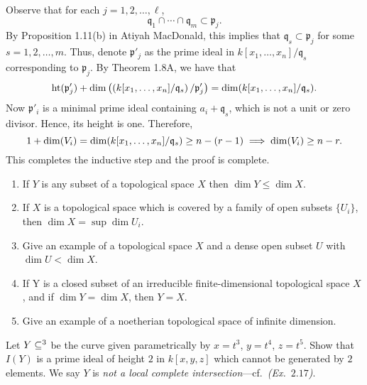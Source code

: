 \documentclass{/Users/SHER/Documents/Hartshorne-Exercises/hw_pset} %
\DeclareMathOperator{\Ht}{\rm{ht}}    %
\DeclareMathOperator{\Dim}{\rm{dim}}  %
\let\aa\relax
\DeclareMathOperator{\aa}{\mathbf{A}} %
\newcommand{\x}{x_1, \dots, x_n}    %
\newcommand{\idl}[1]{\mathfrak{#1}} %
\begin{document}
\begin{solution}
\begin{description}
        Observe that for each $j = 1, 2, \dots, {\ell}$, 
        \[
            \idl{q}_1 \cap \cdots \cap \idl{q}_{m} \subset \idl{p}_j.
        \]
        By Proposition 1.11(b) in Atiyah MacDonald, this implies that 
        $\idl{q}_s \subset \idl{p}_j$ for some $s = 1, 2, \dots, m$. 
        Thus, denote $\idl{p}'_j$ as the prime ideal in $k[\x]/\idl{q}_s$ 
        corresponding to $\idl{p}_j$. 
        By Theorem 1.8A, we have that 
        \[
            \Ht(\idl{p}'_j) + \Dim\left( \left(k[\x]/\idl{q}_s\right)/\idl{p}'_j \right)
            =
            \Dim(k[\x]/\idl{q}_s).
        \]
        Now $\idl{p}'_i$ is a minimal prime ideal containing $a_i + \idl{q}_s$, which is not a unit
        or zero divisor. Hence, its height is one. Therefore, 
        \[
            1 + \Dim(V_i) = \Dim(k[\x]/\idl{q}_s) \ge n - (r - 1)
            \implies 
            \Dim(V_i) \ge n - r.
        \]
        This completes the inductive step and the proof is complete. 
    \end{description}
\end{solution}

\begin{exercise}[1.10]
    \begin{enumerate}
        \item If $Y$ is any subset of a topological space $X$ then $\dim Y \leq \dim X$. 
        \item If $X$ is a topological space which is covered by a family of open
          subsets $\{U_{i}\}$, then $\dim X = \sup \dim U_i$.
        \item Give an example of a topological space $X$ and a dense open subset $U$
          with $\dim U < \dim X$. 
        \item If Y is a closed subset of an irreducible finite-dimensional topological space $X$, and if $\dim Y = \dim X$, then $Y= X$. 
        \item Give an example of a noetherian topological space of infinite dimension.  
    \end{enumerate}
\end{exercise}

\begin{solution}
    
\end{solution}

\begin{exercise}[1.11]
    Let $Y \subseteq \aa^3$ be the curve given parametrically by
    $x = t^3$, $y= t^4$, $z = t^5$.
    Show that $I(Y)$ is a prime ideal of height $2$ in $k[x,y,z]$ which cannot
    be generated by $2$ elements.
    We say $Y$ is \emph{not a local complete
    intersection}---cf.~\emph{(Ex.~$2.17$)}. 
\end{exercise}
\end{document}

